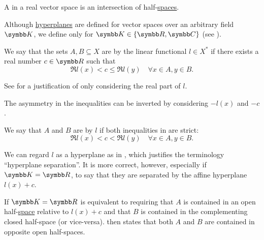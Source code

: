 \begin{definition}\label{def:polyhedron}
  A  in a real vector space is an intersection of half-\hyperref[def:half_space]{spaces}.
\end{definition}

\begin{definition}\label{def:hyperplane_separation}
  Although \hyperref[def:hyperplane]{hyperplanes} are defined for vector spaces over an arbitrary field \( \BK \), we define  only for \( \BK \in \{ \BR, \BC \} \) (see ).

  We say that the sets \( A, B \subseteq X \) are  by the linear functional \( l \in X^* \) if there exists a real number \( c \in \BR \) such that
  \begin{equation}\label{def:hyperplane_separation/normal}
    \Re l(x) < c \leq \Re l(y) \quad\forall x \in A, y \in B.
  \end{equation}

  See  for a justification of only considering the real part of \( l \).

  The asymmetry in the inequalities  can be inverted by considering \( -l(x) \) and \( -c \).

  We say that \( A \) and \( B \) are  by \( l \) if both inequalities in  are strict:
  \begin{equation}\label{def:hyperplane_separation/strong}
    \Re l(x) < c < \Re l(y) \quad\forall x \in A, y \in B.
  \end{equation}

  We can regard \( l \) as a hyperplane as in , which justifies the terminology \enquote{hyperplane separation}. It is more correct, however, especially if \( \BK = \BR \), to say that they are separated by the affine hyperplane \( l(x) + c \).

  If \( \BK = \BR \)  is equivalent to requiring that \( A \) is contained in an open half-\hyperref[def:half_space]{space} relative to \( l(x) + c \) and that \( B \) is contained in the complementing closed half-space (or vice-versa).  then states that both \( A \) and \( B \) are contained in opposite open half-spaces.
\end{definition}

